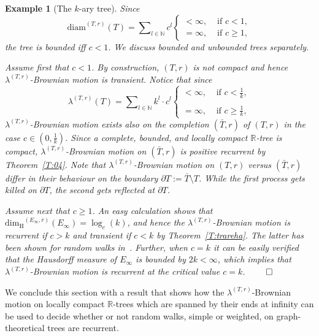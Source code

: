 \documentclass[11pt]{amsart}
\numberwithin{equation}{section}
\newtheorem{example}[definition]{Example}
\begin{document}
{\begin{example}[The $k$-ary tree]
Since
\begin{equation}\label{e:diamk}
   \mathrm{diam}^{(T,r)}(T)
 =
    \sum\nolimits_{l\in{{\mathbb N}}}c^l
    \left\{\begin{array}{cc}<\infty, & \mbox{ if }c<1,\\ =\infty, & \mbox{ if }c\ge 1,\end{array} \right.
\end{equation}
the tree is bounded iff $c<1$. We discuss bounded and unbounded trees separately.

Assume first that $c<1$. By construction, $(T,r)$ is not compact and hence $\lambda^{(T,r)}$-Brownian motion is transient.
Notice that since
\begin{equation}
   \lambda^{(T,r)}(T)
 =
    \sum\nolimits_{l\in{{\mathbb N}}}k^l\cdot c^l
   \left\{\begin{array}{cc}<\infty, & \mbox{ if }c<\frac{1}{k},\\ &\\ =\infty, & \mbox{ if }c\ge \frac{1}{k},\end{array} \right.
\end{equation}
$\lambda^{(T,r)}$-Brownian motion exists also on the completion $(\bar{T},r)$ of $(T,r)$ in the case $c\in(0,\frac{1}{k})$.
Since a complete, bounded, and locally compact ${{\mathbb R}}$-tree is compact,
$\lambda^{(T,r)}$-Brownian motion on $(\bar{T},r)$ is positive recurrent by Theorem~\ref{T:04}. Note that $\lambda^{(T,r)}$-Brownian motion on $(T,r)$ versus $(\bar{T},r)$
differ in their behaviour on the boundary $\partial T:=\bar{T}\setminus T$. While the first process gets killed on $\partial T$, the second gets reflected at $\partial T$.

Assume next that $c\ge 1$. An easy calculation shows that $\mathrm{dim_H}^{(E_\infty,\bar{r})}(E_\infty)=\log_c(k)$, and hence the
$\lambda^{(T,r)}$-Brownian motion is recurrent if
$c>k$ and transient if $c<k$ by Theorem~\ref{T:trareha}. The latter has been shown for random walks in~\cite{Lyo90}.
{Further, when $c=k$ it can be easily verified that the Hausdorff measure of $E_\infty$ is bounded by $2k<\infty$, which implies that
$\lambda^{(T,r)}$-Brownian motion is recurrent at the critical value $c=k$.}
\hfill$\qed$
\end{example}{\smallskip}

We conclude this section with a result that shows how the $\lambda^{(T,r)}$-Brownian motion on locally  compact ${{\mathbb R}}$-trees which are spanned by their ends at infinity
can be used to  decide whether or not random walks, simple or weighted, on graph-theoretical trees are recurrent.{\smallskip}

}
\end{document}

